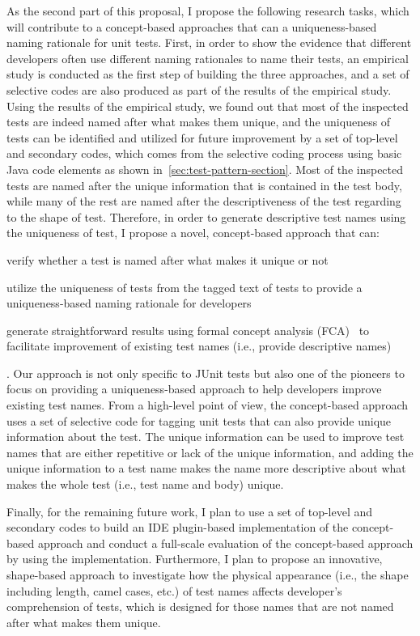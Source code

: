 As the second part of this proposal, I propose the following research tasks, which will contribute to a concept-based approaches that can a uniqueness-based naming rationale for unit tests.
%
First, in order to show the evidence that different developers often use different naming rationales to name their tests, an empirical study is conducted as the first step of building the three approaches, and a set of selective codes are also produced as part of the results of the empirical study.
%
Using the results of the empirical study, we found out that most of the inspected tests are indeed named after what makes them unique, and the uniqueness of tests can be identified and utilized for future improvement by a set of top-level and secondary codes, which comes from the selective coding process using basic Java code elements as shown in~\cref{sec:test-pattern-section}.
%
Most of the inspected tests are named after the unique information that is contained in the test body, while many of the rest are named after the descriptiveness of the test regarding to the shape of test.
%
Therefore, in order to generate descriptive test names using the uniqueness of test, I propose a novel, concept-based approach that can:
%
\begin{enumerate*}
\item verify whether a test is named after what makes it unique or not
\item utilize the uniqueness of tests from the tagged text of tests to provide a uniqueness-based naming rationale for developers
\item generate straightforward results using formal concept analysis (FCA)~\cite{ganter2012formal} to facilitate improvement of existing test names (i.e., provide descriptive names)
\end{enumerate*}.
%
Our approach is not only specific to JUnit tests but also one of the pioneers to focus on providing a uniqueness-based approach to help developers improve existing test names.
%
From a high-level point of view, the concept-based approach uses a set of selective code for tagging unit tests that can also provide unique information about the test.
%
The unique information can be used to improve test names that are either repetitive or lack of the unique information, and adding the unique information to a test name makes the name more descriptive about what makes the whole test (i.e., test name and body) unique.


Finally, for the remaining future work, I plan to use a set of top-level and secondary codes to build an IDE plugin-based implementation of the concept-based approach and conduct a full-scale evaluation of the concept-based approach by using the implementation.
%
Furthermore, I plan to propose an innovative, shape-based approach to investigate how the physical appearance (i.e., the shape including length, camel cases, etc.) of test names affects developer's comprehension of tests, which is designed for those names that are not named after what makes them unique.
